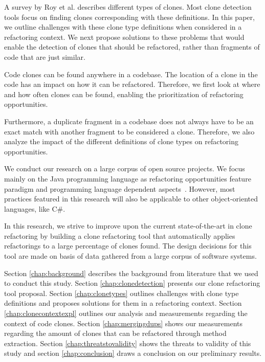 \documentclass[a4paper]{article}
\begin{document}
A survey by Roy et al. \cite{roy2007survey} describes different types of clones. Most clone detection tools focus on finding clones corresponding with these definitions. In this paper, we outline challenges with these clone type definitions when considered in a refactoring context. We next propose solutions to these problems that would enable the detection of clones that should be refactored, rather than fragments of code that are just similar.

Code clones can be found anywhere in a codebase. The location of a clone in the code has an impact on how it can be refactored. Therefore, we first look at where and how often clones can be found, enabling the prioritization of refactoring opportunities.

Furthermore, a duplicate fragment in a codebase does not always have to be an exact match with another fragment to be considered a clone. Therefore, we also analyze the impact of the different definitions of clone types on refactoring opportunities.

We conduct our research on a large corpus of open source projects. We focus mainly on the Java programming language as refactoring opportunities feature paradigm and programming language dependent aspects~\cite{choi2011extracting}. However, most practices featured in this research will also be applicable to other object-oriented languages, like C\#.

In this research, we strive to improve upon the current state-of-the-art in clone refactoring \cite{fontana2015duplicated, alwaqfi2017refactoring} by building a clone refactoring tool that automatically applies refactorings to a large percentage of clones found. The design decisions for this tool are made on basis of data gathered from a large corpus of software systems.

Section \ref{chap:background} describes the background from literature that we used to conduct this study. Section \ref{chap:clonedetection} presents our clone refactoring tool proposal. Section \ref{chap:clonetypes} outlines challenges with clone type definitions and proposes solutions for them in a refactoring context. Section \ref{chap:clonecontextexpl} outlines our analysis and measurements regarding the context of code clones. Section \ref{chap:mergingdups} shows our measurements regarding the amount of clones that can be refactored through method extraction. Section \ref{chap:threatstovalidity} shows the threats to validity of this study and section \ref{chap:conclusion} draws a conclusion on our preliminary results.
\end{document}
